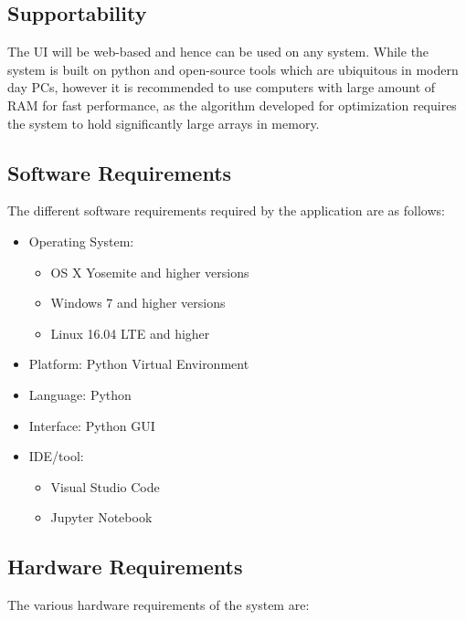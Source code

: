     \subsection{Supportability}
    The UI will be web-based and hence can be used on any system. While the
    system is built on python and open-source tools which are ubiquitous in
    modern day PCs, however it is recommended to use computers with large amount
    of RAM for fast performance, as the algorithm developed for optimization
    requires the system to hold significantly large arrays in memory.

    \subsection{Software Requirements}
    The different software requirements required by the application are as
    follows:
    \begin{itemize}
        \item Operating System:
        \begin{itemize}
            \item OS X Yosemite and higher versions
            \item Windows 7 and higher versions
            \item Linux 16.04 LTE and higher
        \end{itemize}
        \item Platform: Python Virtual Environment
        \item Language: Python
        \item Interface: Python GUI
        \item IDE/tool:
        \begin{itemize}
            \item Visual Studio Code
            \item Jupyter Notebook
        \end{itemize}
    \end{itemize}

    \subsection{Hardware Requirements}
    The various hardware requirements of the system are:

